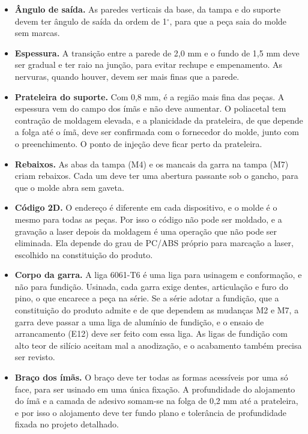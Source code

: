 \begin{itemize}
    \item \textbf{Ângulo de saída.} As paredes verticais da base, da tampa e do suporte devem ter ângulo de saída da ordem de 1$^\circ$, para que a peça saia do molde sem marcas.
    \item \textbf{Espessura.} A transição entre a parede de 2,0 mm e o fundo de 1,5 mm deve ser gradual e ter raio na junção, para evitar rechupe e empenamento. As nervuras, quando houver, devem ser mais finas que a parede.
    \item \textbf{Prateleira do suporte.} Com 0,8 mm, é a região mais fina das peças. A espessura vem do campo dos ímãs e não deve aumentar. O poliacetal tem contração de moldagem elevada, e a planicidade da prateleira, de que depende a folga até o ímã, deve ser confirmada com o fornecedor do molde, junto com o preenchimento. O ponto de injeção deve ficar perto da prateleira.
    \item \textbf{Rebaixos.} As abas da tampa (M4) e os mancais da garra na tampa (M7) criam rebaixos. Cada um deve ter uma abertura passante sob o gancho, para que o molde abra sem gaveta.
    \item \textbf{Código 2D.} O endereço é diferente em cada dispositivo, e o molde é o mesmo para todas as peças. Por isso o código não pode ser moldado, e a gravação a laser depois da moldagem é uma operação que não pode ser eliminada. Ela depende do grau de PC/ABS próprio para marcação a laser, escolhido na constituição do produto.
    \item \textbf{Corpo da garra.} A liga 6061-T6 é uma liga para usinagem e conformação, e não para fundição. Usinada, cada garra exige dentes, articulação e furo do pino, o que encarece a peça na série. Se a série adotar a fundição, que a constituição do produto admite e de que dependem as mudanças M2 e M7, a garra deve passar a uma liga de alumínio de fundição, e o ensaio de arrancamento (E12) deve ser feito com essa liga. As ligas de fundição com alto teor de silício aceitam mal a anodização, e o acabamento também precisa ser revisto.
    \item \textbf{Braço dos ímãs.} O braço deve ter todas as formas acessíveis por uma só face, para ser usinado em uma única fixação. A profundidade do alojamento do ímã e a camada de adesivo somam-se na folga de 0,2 mm até a prateleira, e por isso o alojamento deve ter fundo plano e tolerância de profundidade fixada no projeto detalhado.
\end{itemize}

